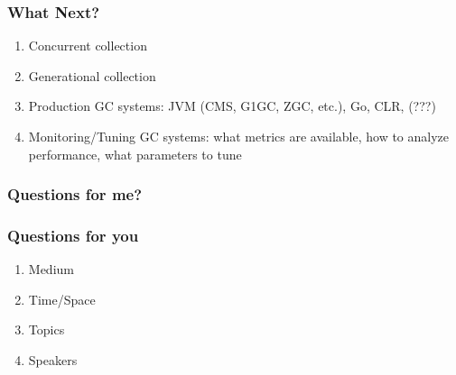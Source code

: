 \documentclass{beamer}
\begin{document}
\begin{frame}
  \frametitle{What Next?}
  
  \begin{enumerate}
    \item Concurrent collection
    \item Generational collection
    \item Production GC systems: JVM (CMS, G1GC, ZGC, etc.), Go, CLR, (???)
    \item Monitoring/Tuning GC systems: what metrics are available, how to analyze performance, what parameters to tune
  \end{enumerate}
\end{frame}

\begin{frame}
  \frametitle{Questions for me?}
\end{frame}

\begin{frame}
  \frametitle{Questions for you}

  \begin{enumerate}
    \item Medium
    \item Time/Space
    \item Topics
    \item Speakers
  \end{enumerate}
\end{frame}
\end{document}
